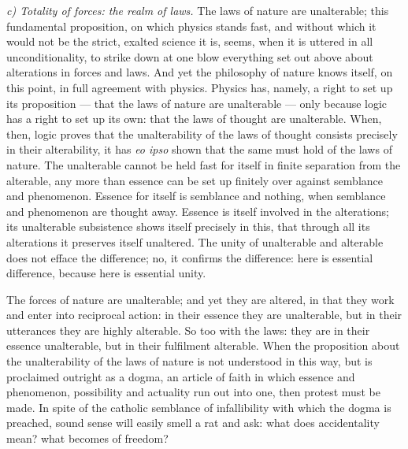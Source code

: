 \documentclass[12pt,a4paper]{book}
\newcommand{\runin}[1]{\emph{#1}\hspace{0.4em}}
\begin{document}
\runin{c) Totality of forces: the realm of laws.} The laws of nature are unalterable;
this fundamental proposition, on which physics stands fast, and without which it would
not be the strict, exalted science it is, seems, when it is
uttered in all unconditionality, to strike down at one blow everything set out above
about alterations in forces and laws. And yet the philosophy of nature knows itself, on
this point, in full agreement with physics. Physics has, namely, a right to set up its
proposition --- that the laws of nature are unalterable --- only because logic has a
right to set up its own: that the laws of thought are unalterable. When, then, logic
proves that the unalterability of the laws of thought consists precisely in their
alterability, it has \textit{eo ipso} shown that the same must hold of the laws of
nature. The unalterable cannot be held fast for itself in finite separation from the
alterable, any more than essence can be set up finitely over against semblance and
phenomenon. Essence for itself is semblance and nothing, when semblance and phenomenon
are thought away. Essence is itself involved in the alterations; its unalterable
subsistence shows itself precisely in this, that through all its alterations it
preserves itself unaltered. The unity of unalterable and alterable does not efface the
difference; no, it confirms the difference: here is essential difference, because here
is essential unity.

The forces of nature are unalterable; and yet they are altered, in that they work and
enter into reciprocal action: in their essence they are unalterable, but in their
utterances they are highly alterable. So too with the laws: they are in their essence
unalterable, but in their fulfilment alterable. When the proposition about the
unalterability of the laws of nature is not understood in this way, but is proclaimed
outright as a dogma, an article of faith in which essence and phenomenon, possibility
and actuality run out into one, then protest must be made. In spite of the catholic
semblance of infallibility with which the dogma is preached, sound sense will easily
smell a rat and ask: what does accidentality mean? what becomes of freedom?
\end{document}
